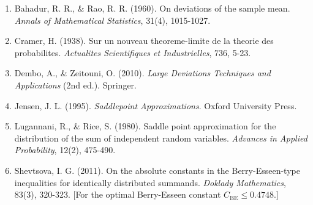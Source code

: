 \documentclass[
  12pt,
]{article}
\providecommand{\tightlist}{%
  \setlength{\itemsep}{0pt}\setlength{\parskip}{0pt}}
\begin{document}
\begin{enumerate}
\def\labelenumi{\arabic{enumi}.}
\tightlist
\item
  Bahadur, R. R., \& Rao, R. R. (1960). On deviations of the sample
  mean. \emph{Annals of Mathematical Statistics}, 31(4), 1015-1027.
\item
  Cramer, H. (1938). Sur un nouveau theoreme-limite de la theorie des
  probabilites. \emph{Actualites Scientifiques et Industrielles}, 736,
  5-23.
\item
  Dembo, A., \& Zeitouni, O. (2010). \emph{Large Deviations Techniques
  and Applications} (2nd ed.). Springer.
\item
  Jensen, J. L. (1995). \emph{Saddlepoint Approximations}. Oxford
  University Press.
\item
  Lugannani, R., \& Rice, S. (1980). Saddle point approximation for the
  distribution of the sum of independent random variables.
  \emph{Advances in Applied Probability}, 12(2), 475-490.
\item
  Shevtsova, I. G. (2011). On the absolute constants in the
  Berry-Esseen-type inequalities for identically distributed summands.
  \emph{Doklady Mathematics}, 83(3), 320-323. {[}For the optimal
  Berry-Esseen constant \(C_{\text{BE}} \leq 0.4748\).{]}
\end{enumerate}
\end{document}
